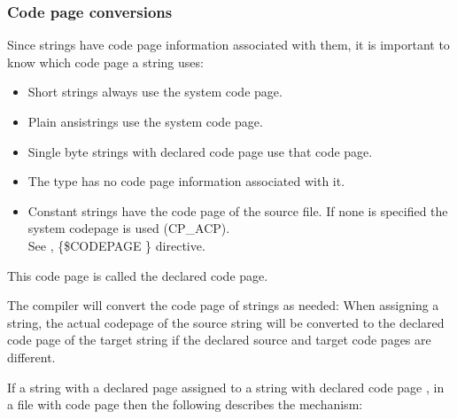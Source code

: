 \subsubsection{Code page conversions}
Since strings have code page information associated with them, it is important to know which code page a string uses:
\begin{itemize}
\item Short strings always use the system code page.
\item Plain ansistrings use the system code page.
\item Single byte strings with declared code page use that code page.
\item The  type has no code page information associated with it.
\item Constant strings have the code page of the source file.
If none is specified the system codepage is used (CP\_ACP).\\
See \progref, \{\$CODEPAGE \} directive.
\end{itemize}
This code page is called the declared code page.

The compiler will convert the code page of strings as needed: When assigning a string,
the actual codepage of the source string will be converted to the declared code
page of the target string if the declared source and target code pages are different.

If a string with a declared page  assigned to a string with
declared code page , in a file with code page  then
the following describes the mechanism:

